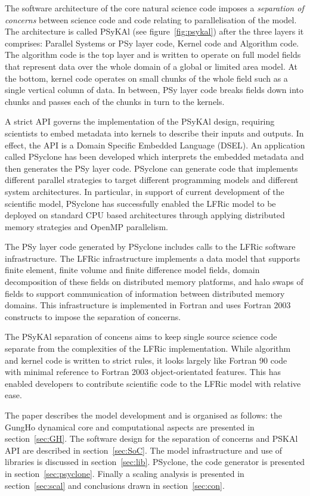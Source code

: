 \documentclass[review,times]{elsarticle}
\begin{document}
The software architecture of the core natural science code imposes a
{\em separation of concerns} between science code and code relating to
parallelisation of the model. The architecture is called PSyKAl (see
figure~\ref{fig:psykal}) after the three layers it comprises: Parallel
Systems or PSy layer code, Kernel code and Algorithm code. The
algorithm code is the top layer and is written to operate on full
model fields that represent data over the whole domain of a global or
limited area model. At the bottom, kernel code operates on small
chunks of the whole field such as a single vertical column of data. In
between, PSy layer code breaks fields down into chunks and passes each
of the chunks in turn to the kernels.

A strict API governs the implementation of the PSyKAl design,
requiring scientists to embed metadata into kernels to describe their
inputs and outputs. In effect, the API is a Domain Specific Embedded
Language (DSEL). An application called PSyclone has been developed
which interprets the embedded metadata and then generates the PSy
layer code. PSyclone can generate code that implements different
parallel strategies to target different programming models and
different system architectures. In particular, in support of current
development of the scientific model, PSyclone has successfully enabled
the LFRic model to be deployed on standard CPU based architectures through
applying distributed memory strategies and OpenMP parallelism.

The PSy layer code generated by PSyclone includes calls to the LFRic
software infrastructure. The LFRic infrastructure implements a data
model that supports finite element, finite volume and finite
difference model fields, domain decomposition of these fields on
distributed memory platforms, and halo swaps of fields to support
communication of information between distributed memory domains. This
infrastructure is implemented in Fortran and uses Fortran 2003
constructs to impose the separation of concerns.

The PSyKAl separation of concens aims to keep single source science
code separate from the complexities of the LFRic implementation. While
algorithm and kernel code is written to strict rules, it looks largely
like Fortran 90 code with minimal reference to Fortran 2003
object-orientated features. This has enabled developers to contribute
scientific code to the LFRic model with relative ease.

The paper describes the model development and is organised as follows:
the GungHo dynamical core and computational aspects are presented in
section~\ref{sec:GH}. The software design for the separation of
concerns and PSKAl API are described in
section~\ref{sec:SoC}. The model infrastructure and use of libraries
is discussed in section~\ref{sec:lib}. PSyclone, the code generator is
presented in section~\ref{sec:psyclone}. Finally a scaling analysis is
presented in section~\ref{sec:scal} and conclusions drawn in
section~\ref{sec:con}.
\end{document}
